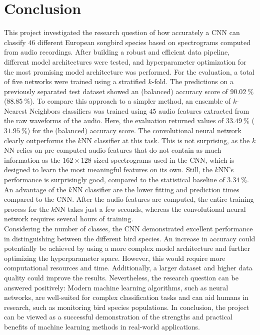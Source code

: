 \section{Conclusion}
\label{sec:conclusion}
This project investigated the research question of how accurately a CNN can classify $\num{46}$ different European songbird species based on spectrograms computed from audio recordings. 
After building a robust and efficient data pipeline, different model architectures were tested, and hyperparameter optimization for the most promising model architecture was performed. 
For the evaluation, a total of five networks were trained using a stratified $k$-fold. The predictions on a previously separated test dataset showed an (balanced) accuracy score of
$\qty{90.02}{\percent}$ ($\qty{88.85}{\percent}$). To compare this approach to a simpler method, an ensemble of $k$-Nearest Neighbors classifiers 
was trained using $\num{45}$ audio features extracted from the raw waveforms of the audio. Here, the evaluation returned values of $\qty{33.49}{\percent}$ ($\qty{31.95}{\percent}$) for 
the (balanced) accuracy score. 
The convolutional neural network clearly outperforms the $k$NN classifier at this task. This is not surprising, as the $k$NN relies on pre-computed audio features 
that do not contain as much information as the $\num{162} \times \num{128}$ sized spectrograms used in the CNN, which is designed to learn the most meaningful features on its own.
Still, the $k$NN's performance is surprisingly good, compared to the statistical baseline of $\qty{3.34}{\percent}$. An advantage of the $k$NN classifier are the lower fitting and 
prediction times compared to the CNN. After the audio features are computed, the entire training process for the $k$NN takes just a few seconds, whereas the convolutional neural 
network requires several hours of training.\\ 
Considering the number of classes, the CNN demonstrated excellent performance in distinguishing between the different bird species. An increase in accuracy could potentially be 
achieved by using a more complex model architecture and further optimizing the hyperparameter space. However, this would require more computational resources and time. Additionally, 
a larger dataset and higher data quality could improve the results. Nevertheless, the research question can be answered positively: Modern machine learning algorithms, 
such as neural networks, are well-suited for complex classification tasks and can aid humans in research, such as monitoring bird species populations. In conclusion, 
the project can be viewed as a successful demonstration of the strengths and practical benefits of machine learning methods in real-world applications.

